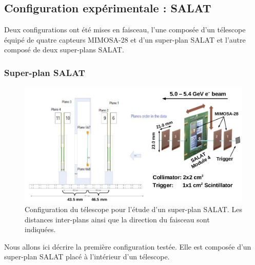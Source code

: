   \subsection{Configuration exp\'erimentale : SALAT}

  Deux configurations ont \'et\'e mises en faisceau, l'une compos\'ee d'un t\'elescope \'equipé de quatre capteurs MIMOSA-28 et d'un super-plan SALAT et l'autre compos\'e de deux super-plans SALAT.
  
  \subsubsection{Super-plan SALAT}

   \begin{figure}[!htb]
    \begin{center} 
      \includegraphics[scale=0.39]{./figures/SALAT_beam_test/SALAT_config.png}
      \caption{Configuration du t\'elescope pour l'\'etude d'un super-plan SALAT. Les distances inter-plans ainsi que la direction du faisceau sont indiqu\'ees.}
      \label{fig:config_SALAT_1}
    \end{center}
   \end{figure}
  
  Nous allons ici d\'ecrire la premi\`ere configuration test\'ee. Elle est compos\'ee d'un super-plan SALAT plac\'e \`a l'int\'erieur d'un télescope.
  
  \medskip

